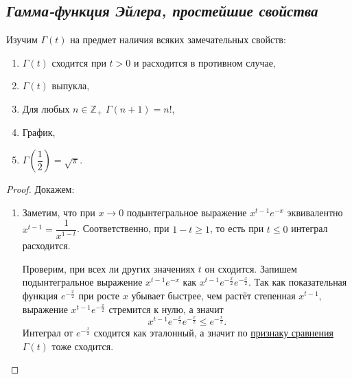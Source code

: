 \subsection{\itshape Гамма-функция Эйлера, простейшие свойства}

\begin{theorem}
	Изучим \(\Gamma(t)\) на предмет наличия всяких замечательных \linebreak свойств:
	\begin{enumerate}
		\item \(\Gamma(t)\) сходится при \(t > 0\) и расходится в противном случае,
		\item \(\Gamma(t)\) выпукла,
		\item Для любых \(n \in \mathbb{Z}_+\) \(\Gamma(n + 1) = n!\),
		\item График,
		\item \(\Gamma \left(\dfrac{1}{2} \right) = \sqrt{\pi}\).
	\end{enumerate}
\end{theorem}

\begin{proof}
	Докажем:
	\begin{enumerate}
		\item Заметим, что при \(x \to 0\) подынтегральное выражение \(x^{t - 1} e^{-x}\) эквивалентно \(x^{t - 1} = \dfrac{1}{x^{1 - t}}\). Соответственно, при \(1 - t \geqslant 1\), то есть при \(t \leqslant 0\) интеграл расходится.
		
		Проверим, при всех ли других значениях \(t\) он сходится. Запишем подынтегральное выражение \(x^{t - 1} e^{-x}\) как \(x^{t - 1} e^{-\frac{x}{2}} e^{-\frac{x}{2}}\). Так как показательная функция \(e^{-\frac{x}{2}}\) при росте \(x\) убывает быстрее, чем растёт степенная \(x^{t - 1}\), выражение \(x^{t - 1} e^{-\frac{x}{2}}\) стремится к нулю, а значит \[
			x^{t - 1} e^{-\frac{x}{2}} e^{-\frac{x}{2}} \leqslant  e^{-\frac{x}{2}}.
		\]
		Интеграл от \(e^{-\frac{x}{2}}\) сходится как эталонный, а значит по \hyperlink{priz}{признаку сравнения} \(\Gamma(t)\) тоже сходится.
	\end{enumerate}
\end{proof}
